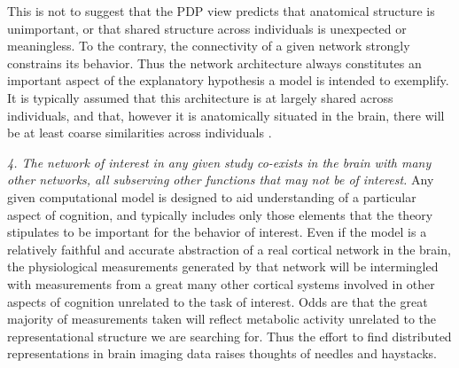 This is not to suggest that the PDP view predicts that anatomical structure is unimportant, or that shared structure across individuals is unexpected or meaningless. To the contrary, the connectivity of a given network strongly constrains its behavior. Thus the network architecture always constitutes an important aspect of the explanatory hypothesis a model is intended to exemplify. It is typically assumed that this architecture is at largely shared across individuals, and that, however it is anatomically situated in the brain, there will be at least coarse similarities across individuals . 

{\em 4. The network of interest in any given study co-exists in the brain with many other networks, all subserving other functions that may not be of interest.} Any given computational model is designed to aid understanding of a particular aspect of cognition, and typically includes only those elements that the theory stipulates to be important for the behavior of interest. Even if the model is a relatively faithful and accurate abstraction of a real cortical network in the brain, the physiological measurements generated by that network will be intermingled with measurements from a great many other cortical systems involved in other aspects of cognition unrelated to the task of interest. Odds are that the great majority of measurements taken will reflect metabolic activity unrelated to the representational structure we are searching for. Thus the effort to find distributed representations in brain imaging data raises thoughts of needles and haystacks. 


